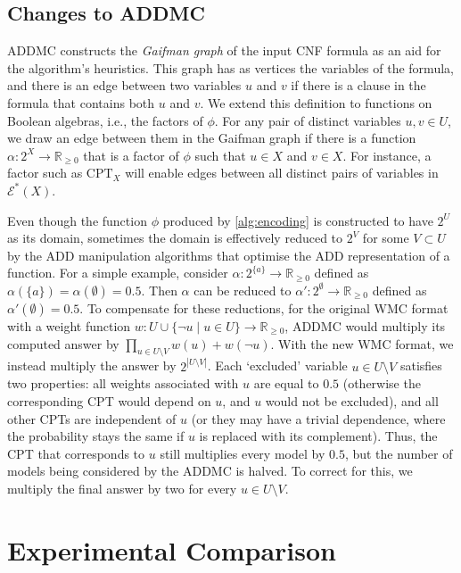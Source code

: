\documentclass[letterpaper]{article} %
\theoremstyle{definition}
\theoremstyle{remark}
\begin{document}
{\subsection{Changes to ADDMC}

ADDMC constructs the \emph{Gaifman graph} \cite{gaifman1982local} of the input
CNF formula as an aid for the algorithm's heuristics. This graph has as vertices
the variables of the formula, and there is an edge between two variables $u$ and
$v$ if there is a clause in the formula that contains both $u$ and $v$. We
extend this definition to functions on Boolean algebras, i.e., the factors of
$\phi$. For any pair of distinct variables $u, v \in U$, we draw an edge between
them in the Gaifman graph if there is a function $\alpha\colon 2^X \to
\mathbb{R}_{\ge 0}$ that is a factor of $\phi$ such that $u \in X$ and $v \in
X$. For instance, a factor such as $\mathrm{CPT}_X$ will enable edges between
all distinct pairs of variables in $\mathcal{E}^*(X)$.

Even though the function $\phi$ produced by \cref{alg:encoding} is constructed
to have $2^U$ as its domain, sometimes the domain is effectively reduced to
$2^V$ for some $V \subset U$ by the ADD manipulation algorithms that optimise
the ADD representation of a function. For a simple example, consider $\alpha:
2^{\{a\}} \to \mathbb{R}_{\ge 0}$ defined as $\alpha(\{a\}) = \alpha(\emptyset)
= 0.5$. Then $\alpha$ can be reduced to $\alpha'\colon 2^{\emptyset} \to
\mathbb{R}_{\ge 0}$ defined as $\alpha'(\emptyset) = 0.5$. To compensate for
these reductions, for the original WMC format with a weight function $w\colon U
\cup \{ \neg u \mid u \in U \} \to \mathbb{R}_{\ge 0}$, ADDMC would multiply its
computed answer by $\prod_{u \in U \setminus V} w(u) + w(\neg u)$. With the new
WMC format, we instead multiply the answer by $2^{|U \setminus V|}$. Each
`excluded' variable $u \in U \setminus V$ satisfies two properties:
all weights associated with $u$ are equal to $0.5$ (otherwise the corresponding
CPT would depend on $u$, and $u$ would not be excluded), and all other CPTs are
independent of $u$ (or they may have a trivial dependence, where the probability
stays the same if $u$ is replaced with its complement).
Thus, the CPT that corresponds to $u$ still multiplies every model by $0.5$, but
the number of models being considered by the ADDMC is halved. To correct for
this, we multiply the final answer by two for every $u \in U \setminus V$.

\section{Experimental Comparison} \label{sec:experiments}

}
\end{document}
